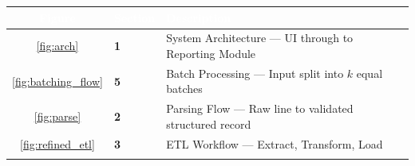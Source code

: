 \documentclass[11pt,a4paper]{article}
\begin{document}
\begin{center}
\renewcommand{\arraystretch}{1.45}
\begin{tabular}{@{} c >{\bfseries}l l @{}}
\arrayrulecolor{PrimaryBlue!30}\toprule
\rowcolor{PrimaryBlue}
  \textcolor{white}{\textbf{Figure}} & \textcolor{white}{\textbf{Section}} & \textcolor{white}{\textbf{Description}} \\
\midrule
\rowcolor{RowAlt}\ref{fig:arch}  & 1 & System Architecture --- UI through to Reporting Module \\
\ref{fig:batching_flow} & 5 & Batch Processing --- Input split into $k$ equal batches \\
\ref{fig:parse} & 2 & Parsing Flow --- Raw line to validated structured record \\
\rowcolor{RowAlt}\ref{fig:refined_etl}   & 3 & ETL Workflow --- Extract, Transform, Load \\
\arrayrulecolor{PrimaryBlue!30}\bottomrule
\end{tabular}
\end{center}
\end{document}
